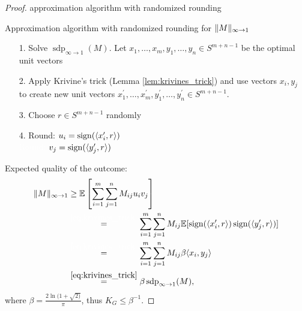 \begin{proof}
	approximation algorithm with randomized rounding
	
	\begin{algorithm}[H]
		\SetAlgoLined
		\caption{Approximation algorithm with randomized rounding for $ \Vert {M} \Vert_{\infty\to 1}$}
	\end{algorithm}
	\begin{itemize}
		\item[1.] Solve $\operatorname{sdp}_{\infty\to 1} (M)$. Let $x_1,\dots,x_m,y_1,\dots,y_n\in S^{m+n-1}$ be the optimal unit vectors
		\item[2.] Apply Krivine's trick (Lemma \ref{lem:krivines_trick}) and use vectors $x_i,y_j$ to create new unit vectors $x_1^\prime,\dots,x_m^\prime, y_1^\prime,\dots,y_n^\prime\in S^{m+n-1}$.
		\item[3.] Choose $r\in S^{m+n-1}$ randomly
		\item[4.] Round: $u_i = \operatorname{sign}(\langle{x_i^\prime},{r}\rangle)$\\
					\textcolor{white}{Round: }$v_j = \operatorname{sign}(\langle{y_j^\prime},{r}\rangle)$
	\end{itemize}
	
	\noindent Expected quality of the outcome:
	\begin{align*}
		\norm{M}_{\infty\to 1} &\geq \mathbb{E}\left[\sum_{i=1}^m\sum_{j=1}^n M_{ij}u_iv_j\right]\\
		&\overset{\textcolor{white}{\eqref*{eq:krivines_trick}}}{=} \sum_{i=1}^m\sum_{j=1}^n M_{ij} \mathbb{E}[\sgn(\sclr{x_i^\prime}{r}) \sgn(\sclr{y_j^\prime}{r})] \\
		&\overset{\textcolor{white}{\eqref*{eq:krivines_trick}}}{=}\sum_{i=1}^m\sum_{j=1}^n M_{ij}\beta \sclr{x_i}{y_j} \\
		&\overset{\eqref{eq:krivines_trick}}{=}\beta \operatorname{sdp}_{\infty\to 1}(M),
	\end{align*}
	where $\beta = \frac{2\ln(1+\sqrt{2)}}{\pi}$, thus $K_G\leq \beta^{-1}$.
\end{proof}

